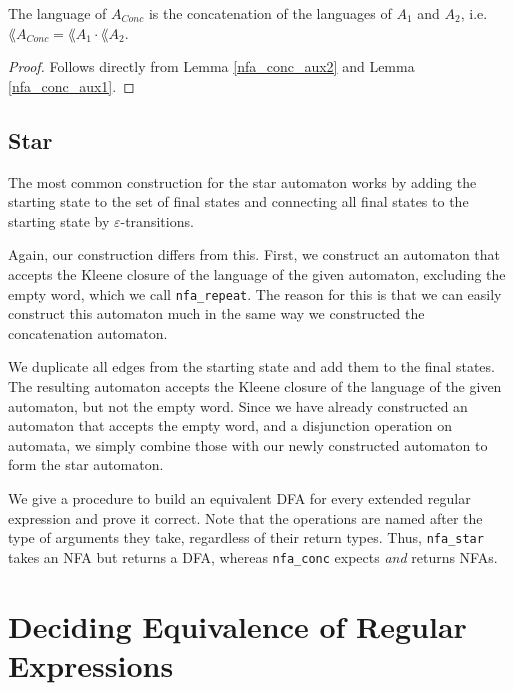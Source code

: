 \begin{corollary}
    The language of $A_{Conc}$ is the concatenation of the languages of $A_1$ and $A_2$, i.e. $\lang{A_{Conc}} = \lang{A_1} \cdot \lang{A_2}$.
\end{corollary}
\begin{proof}
    Follows directly from Lemma \ref{nfa_conc_aux2} and Lemma \ref{nfa_conc_aux1}. 
\end{proof}



\subsection{Star}
The most common construction for the star automaton works by adding the starting state
to the set of final states and connecting all final states to the starting state by $\varepsilon$-transitions.

Again, our construction differs from this.
First, we construct an automaton that accepts the Kleene closure of the language
of the given automaton, excluding the empty word, which we call \lstinline{nfa_repeat}.
The reason for this is that we can easily construct this automaton much in the same way
we constructed the concatenation automaton.

We duplicate all edges from the starting state and add them to the final states.
The resulting automaton accepts the Kleene closure of the language of the given automaton, but not the empty word.
Since we have already constructed an automaton that accepts the empty word, 
and a disjunction operation on automata, we simply combine those with our newly constructed automaton 
to form the star automaton.



We give a procedure to build an equivalent DFA for every extended regular expression and prove it correct.
Note that the operations are named after the type of arguments they take, regardless of their return types.
Thus, \lstinline{nfa_star} takes an NFA but returns a DFA,
whereas \lstinline{nfa_conc} expects \textit{and} returns NFAs. 



\section{Deciding Equivalence of Regular Expressions}

